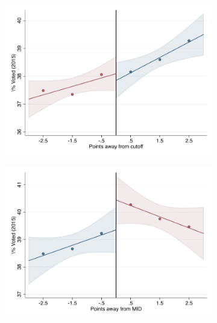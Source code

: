 \documentclass[oneside,11pt]{article}
\begin{document}
\begin{figure}[H]

    \ContinuedFloat
    \caption{(Cont.) RD plots for outcome variables across those assigned to UNAM high-school, and those who are not\label{fig:ITT_rd_plot_UNAM_3}}
    \begin{center}
    
    \begin{subfigure}{0.475\textwidth}
        \centering
        \includegraphics[width=\textwidth]{04_Figures/rd_plot_tau_Voto_Marcado_2015_UNAM3.pdf}
    \end{subfigure}
    \begin{subfigure}{0.475\textwidth}
        \centering
        \includegraphics[width=\textwidth]{04_Figures/rd_plot_mid_Voto_Marcado_2015_UNAM3.pdf}
    \end{subfigure}


\end{center}
\end{figure}
\end{document}
